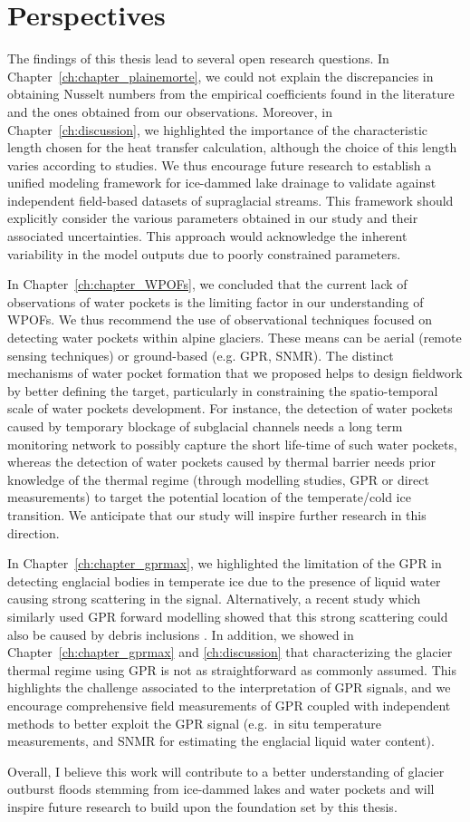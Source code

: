 \section{Perspectives}


The findings of this thesis lead to several open research questions. In Chapter~\ref{ch:chapter_plainemorte}, we could not explain the discrepancies in obtaining Nusselt numbers from the empirical coefficients found in the literature and the ones obtained from our observations. Moreover, in Chapter~\ref{ch:discussion}, we highlighted the importance of the characteristic length chosen for the heat transfer calculation, although the choice of this length varies according to studies. We thus encourage future research to establish a unified modeling framework for ice-dammed lake drainage to validate against independent field-based datasets of supraglacial streams. This framework should explicitly consider the various parameters obtained in our study and their associated uncertainties. This approach would acknowledge the inherent variability in the model outputs due to poorly constrained parameters.
%

In Chapter~\ref{ch:chapter_WPOFs}, we concluded that the current lack of observations of water pockets is the limiting factor in our understanding of WPOFs. We thus recommend the use of observational techniques focused on detecting water pockets within alpine glaciers. These means can be aerial (remote sensing techniques) or ground-based (e.g. GPR, SNMR). The distinct mechanisms of water pocket formation that we proposed helps to design fieldwork by better defining the target, particularly in constraining the spatio-temporal scale of water pockets development. For instance, the detection of water pockets caused by temporary blockage of subglacial channels needs a long term monitoring network to possibly capture the short life-time of such water pockets, whereas the detection of water pockets caused by thermal barrier needs prior knowledge of the thermal regime (through modelling studies, GPR or direct measurements) to target the potential location of the temperate/cold ice transition. We anticipate that our study will inspire further research in this direction.
%

In Chapter~\ref{ch:chapter_gprmax}, we highlighted the limitation of the GPR in detecting englacial bodies in temperate ice due to the presence of liquid water causing strong scattering in the signal. Alternatively, a recent study which similarly used GPR forward modelling showed that this strong scattering could also be caused by debris inclusions \citep{Santin&al2024}. In addition, we showed in Chapter~\ref{ch:chapter_gprmax} and \ref{ch:discussion} that characterizing the glacier thermal regime using GPR is not as straightforward as commonly assumed. This highlights the challenge associated to the interpretation of GPR signals, and we encourage comprehensive field measurements of GPR coupled with independent methods to better exploit the GPR signal (e.g.\ in situ temperature measurements, and SNMR for estimating the englacial liquid water content).
%

Overall, I believe this work will contribute to a better understanding of glacier outburst floods stemming from ice-dammed lakes and water pockets and will inspire future research to build upon the foundation set by this thesis.